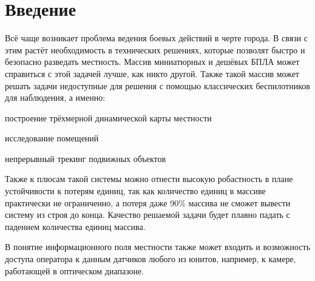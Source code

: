 \newpage
\section{Введение}

Всё чаще возникает проблема ведения боевых действий
в черте города. В связи с этим растёт необходимость в технических
решениях, которые позволят быстро и безопасно разведать местность.
Массив миниатюрных и дешёвых БПЛА может справиться с этой задачей 
лучше, как никто другой. Также такой массив может решать задачи недоступные
для решения с помощью классических беспилотников для наблюдения, а именно: 
\begin{mintemize}
    \item построение трёхмерной динамической карты местности
    \item исследование помещений
    \item непрерывный трекинг подвижных объектов
\end{mintemize}

Также к плюсам такой системы можно отнести высокую робастность в плане
устойчивости к потерям единиц, так как количество единиц в массиве
практически не ограниченно, а потеря даже 90\% массива не сможет
вывести систему из строя до конца.  Качество решаемой задачи
будет плавно падать с падением количества единиц массива.

В понятие информационного поля местности также может входить
и возможность доступа оператора к данным датчиков любого из юнитов, например,
к камере, работающей в оптическом диапазоне.
